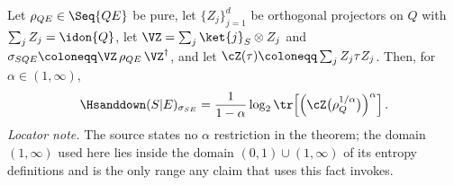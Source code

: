 
\begin{fact}\label{fact:pinch-id}
Let $\rho_{QE}\in\Seq{QE}$ be pure, let $\{Z_j\}_{j=1}^{d}$ be orthogonal
projectors on $Q$ with $\sum_jZ_j=\idon{Q}$, let
$\VZ=\sum_j\ket{j}_{S}\otimes Z_j$ and
$\sigma_{SQE}\coloneqq\VZ\,\rho_{QE}\,\VZ^{\dagger}$, and let
$\cZ(\tau)\coloneqq\sum_jZ_j\tau Z_j$. Then, for $\alpha\in(1,\infty)$,
\begin{equation}\label{eq:pinch-id}
  \Hsanddown(S|E)_{\sigma_{SE}}
  =\frac{1}{1-\alpha}\log_2
  \tr\!\left[\left(\cZ\big(\rho_Q^{1/\alpha}\big)\right)^{\alpha}\right].
\end{equation}
\emph{Locator note.} The source states no $\alpha$ restriction in the
theorem; the domain $(1,\infty)$ used here lies inside the domain
$(0,1)\cup(1,\infty)$ of its entropy definitions and is the only range any
claim that uses this fact invokes.
\end{fact}
